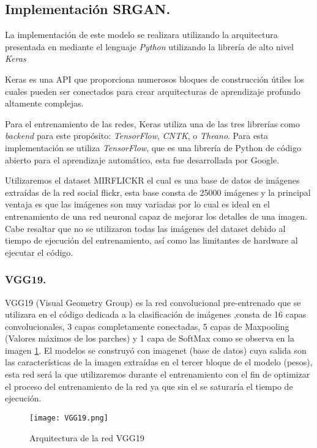 \subsection{Implementación SRGAN.}

La implementación de este modelo se realizara utilizando la arquitectura presentada
en \cite{SRGAN} mediante el lenguaje \emph{Python} utilizando la librería de alto nivel \emph{Keras}

Keras es una API que proporciona numerosos bloques
de construcción útiles los cuales pueden ser conectados para crear arquitecturas de
aprendizaje profundo altamente complejas.

Para el entrenamiento de las redes, Keras utiliza una de las tres librerías como
\emph{backend} para este propósito: \emph{TensorFlow}, \emph{CNTK}, o \emph{Theano}. Para esta implementación
se utiliza \emph{TensorFlow}, que es una librería de Python de código abierto para el
aprendizaje automático, esta fue desarrollada por Google.

Utilizaremos el dataset MIRFLICKR \cite{MIRFLICKR} el cual es una base de datos de imágenes
extraídas de la red social flickr, esta base consta de 25000 imágenes y la principal ventaja es 
que las imágenes son muy variadas por lo cual es ideal en el entrenamiento de una red neuronal capaz 
de mejorar los detalles de una imagen. Cabe resaltar que no se utilizaron todas las imágenes del dataset
debido al tiempo de ejecución del entrenamiento, así como las limitantes de hardware al ejecutar el código.

\subsubsection{VGG19.}

VGG19 (Visual Geometry Group) es la red convolucional pre-entrenado que se utilizara en el código
dedicada a la clasificación de imágenes ,consta de 16 capas convolucionales, 3 capas completamente conectadas, 5 capas de 
Maxpooling (Valores máximos de los parches)  y 1 capa de SoftMax como se observa en la imagen \ref{Alexis35}. El modelos se construyó
 con imagenet (base de datos) cuya salida son las características de la imagen extraídas en el tercer bloque de el modelo (pesos),
 esta red será la que utilizaremos durante el entrenamiento con el fin de optimizar el proceso del entrenamiento de la red
ya que sin el se saturaría el tiempo de ejecución.

 
\begin{figure}[H]
  \begin{center}
    \texttt{[image: VGG19.png]}
    \caption{Arquitectura de la red VGG19}
    \label{Alexis35}
  \end{center}
\end{figure}


